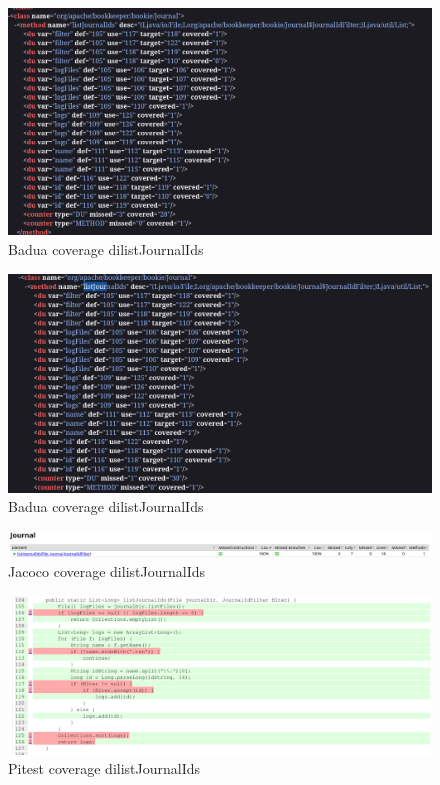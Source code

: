\documentclass[12pt, a4paper]{article}
\begin{document}
  \begin{figure}
    \includegraphics[width=\linewidth]{./images/BaduaCoveragelistJournalIds1.png}
    \caption{Badua coverage dilistJournalIds}
    \label{fig:listJournalIds_badua}
  \end{figure}

  \begin{figure}
    \includegraphics[width=\linewidth]{./images/BaduaCoveragelistJournalIds2.png}
    \caption{Badua coverage dilistJournalIds}
    \label{fig:listJournalIds_badua2}
  \end{figure}

  \begin{figure}
    \includegraphics[width=\linewidth]{./images/JacocoCoveragelistJournalIds3.png}
    \caption{Jacoco coverage dilistJournalIds}
    \label{fig:listJournalIds_jacoco4}
  \end{figure}

  \begin{figure}
    \includegraphics[width=\linewidth]{./images/PitCoverageListJournalIds1.png}
    \caption{Pitest coverage dilistJournalIds}
    \label{fig:listJournalIds_pitest}
  \end{figure}
\end{document}
